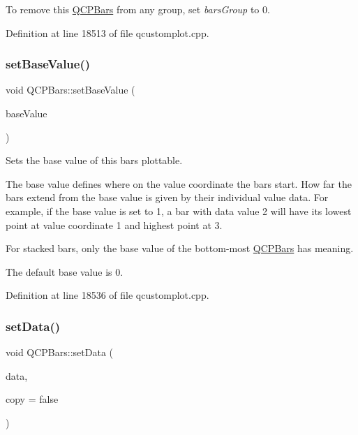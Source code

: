 To remove this \hyperlink{class_q_c_p_bars}{Q\+C\+P\+Bars} from any group, set {\itshape bars\+Group} to 0. 

Definition at line 18513 of file qcustomplot.\+cpp.

\mbox{\label{class_q_c_p_bars_a574ec7eb7537566df1a28ff085d75623}} 
\subsubsection{\texorpdfstring{set\+Base\+Value()}{setBaseValue()}}
{\footnotesize\ttfamily void Q\+C\+P\+Bars\+::set\+Base\+Value (\begin{DoxyParamCaption}\item[{double}]{base\+Value }\end{DoxyParamCaption})}

Sets the base value of this bars plottable.

The base value defines where on the value coordinate the bars start. How far the bars extend from the base value is given by their individual value data. For example, if the base value is set to 1, a bar with data value 2 will have its lowest point at value coordinate 1 and highest point at 3.

For stacked bars, only the base value of the bottom-\/most \hyperlink{class_q_c_p_bars}{Q\+C\+P\+Bars} has meaning.

The default base value is 0. 

Definition at line 18536 of file qcustomplot.\+cpp.

\mbox{\label{class_q_c_p_bars_aa3435aab19e0a49e4e7b41bd36a8d96b}} 
\subsubsection{\texorpdfstring{set\+Data()}{setData()}\hspace{0.1cm}{\footnotesize\ttfamily [1/2]}}
{\footnotesize\ttfamily void Q\+C\+P\+Bars\+::set\+Data (\begin{DoxyParamCaption}\item[{\hyperlink{qcustomplot_8h_aa846c77472cae93def9f1609d0c57191}{Q\+C\+P\+Bar\+Data\+Map} $\ast$}]{data,  }\item[{bool}]{copy = {\ttfamily false} }\end{DoxyParamCaption})}

